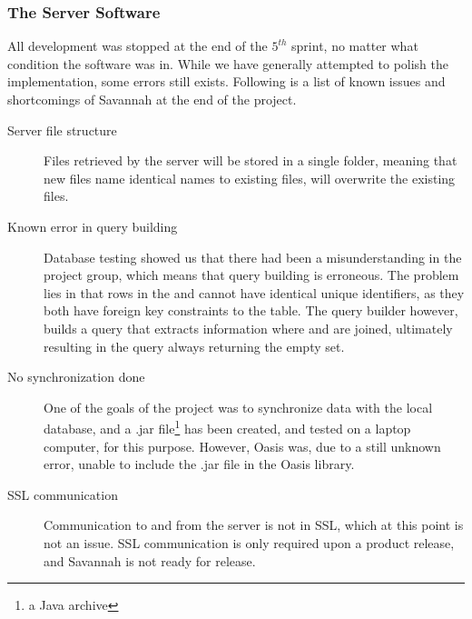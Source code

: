\subsubsection*{The Server Software}
All development was stopped at the end of the $5^{th}$ sprint, no matter what condition the software was in. While we have generally attempted to polish the implementation, some errors still exists. Following is a list of known issues and shortcomings of Savannah at the end of the project.
\begin{description}
 \item[Server file structure] Files retrieved by the server will be stored in a single folder, meaning that new files name identical names to existing files, will overwrite the existing files.

 \item[Known error in query building] Database testing showed us that there had been a misunderstanding in the project group, which means that query building is erroneous. The problem lies in that rows in the  and  cannot have identical unique identifiers, as they both have foreign key constraints to the  table. The query builder however, builds a query that extracts information where  and  are joined, ultimately resulting in the query always returning the empty set.

 \item[No synchronization done] One of the goals of the project was to synchronize data with the local database, and a .jar file\footnote{a Java archive} has been created, and tested on a laptop computer, for this purpose. However, Oasis was, due to a still unknown error, unable to include the .jar file in the Oasis library.

 \item[SSL communication] Communication to and from the server is not in SSL, which at this point is not an issue. SSL communication is only required upon a product release, and Savannah is not ready for release.
 
\end{description}

